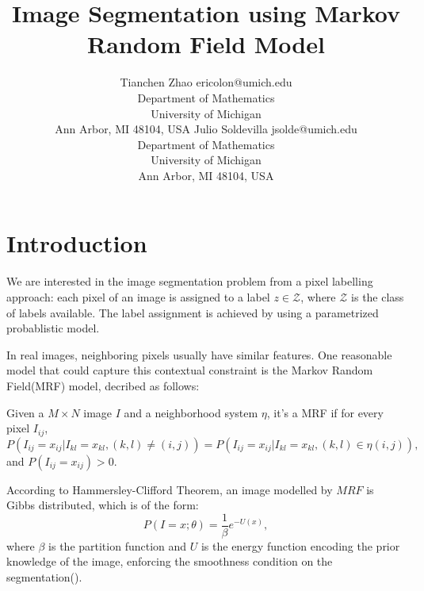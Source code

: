 \documentclass[twoside,10.5pt]{article}
\begin{document}
\title{Image Segmentation using Markov Random Field Model}

\author{\name Tianchen Zhao \email ericolon@umich.edu \\
       \addr Department of Mathematics\\
       University of Michigan\\
       Ann Arbor, MI 48104, USA       \AND
       \name Julio Soldevilla \email jsolde@umich.edu \\
       \addr Department of Mathematics\\
       University of Michigan\\
       Ann Arbor, MI 48104, USA}


\maketitle

%

\section{Introduction}
We are interested in the image segmentation problem from a pixel labelling approach: each pixel of an image is assigned to a label $z \in \mathcal{Z}$, where $\mathcal{Z}$ is the class of labels available. The label assignment is achieved by using a parametrized probablistic model.

In real images, neighboring pixels usually have similar features. One reasonable model that could capture this contextual constraint is the Markov Random Field(MRF) model, decribed as follows:
\begin{definition}
Given a $M \times N$ image $I$ and a neighborhood system $\eta$, it's a MRF if for every pixel $I_{ij}$,
\begin{equation}
P(I_{ij}=x_{ij}|I_{kl}=x_{kl}, (k,l) \neq (i,j)) = P(I_{ij}=x_{ij}|I_{kl}=x_{kl}, (k,l) \in \eta(i,j)),
\end{equation}
and $P(I_{ij}=x_{ij})>0$.
\end{definition}
According to Hammersley-Clifford Theorem, an image modelled by $MRF$ is Gibbs distributed, which is of the form:
\begin{equation} \label{eq:1}
P(I=x;\theta) = \frac{1}{\beta} e^{-U(x)},
\end{equation}
where $\beta$ is the partition function and $U$ is the energy function encoding the prior knowledge of the image, enforcing the smoothness condition on the segmentation(\citet{Brgisser2013}).
\end{document}
